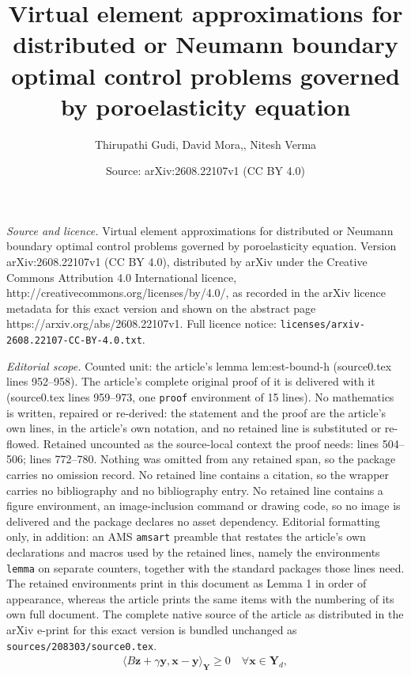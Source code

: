 \documentclass[10pt,a4paper]{amsart}
\title{Virtual element approximations for distributed or Neumann boundary optimal control problems governed by poroelasticity equation}
\author{Thirupathi Gudi, David Mora,, Nitesh Verma}
\date{Source: arXiv:2608.22107v1 (CC BY 4.0)}
\newcommand{\bY}{\boldsymbol{Y}}
\newcommand{\bYd}{\boldsymbol{Y}_d}
\newcommand\bx{\boldsymbol{x}}
\newcommand\by{\boldsymbol{y}}
\newcommand\bz{\boldsymbol{z}}
\begin{document}
\maketitle

\noindent\emph{Source and licence.} Virtual element approximations for distributed or Neumann boundary optimal control problems governed by poroelasticity equation. Version arXiv:2608.22107v1 (CC BY 4.0), distributed by arXiv under the Creative Commons Attribution 4.0 International licence, http://creativecommons.org/licenses/by/4.0/, as recorded in the arXiv licence metadata for this exact version and shown on the abstract page https://arxiv.org/abs/2608.22107v1. Full licence notice: \texttt{licenses/arxiv-2608.22107-CC-BY-4.0.txt}.\par\smallskip

\noindent\textit{Editorial scope.} Counted unit: the article's lemma lem:est-bound-h (source0.tex lines 952--958). The article's complete original proof of it is delivered with it (source0.tex lines 959--973, one \texttt{proof} environment of 15 lines). No mathematics is written, repaired or re-derived: the statement and the proof are the article's own lines, in the article's own notation, and no retained line is substituted or re-flowed.  Retained uncounted as the source-local context the proof needs: lines 504--506; lines 772--780.  Nothing was omitted from any retained span, so the package carries no omission record.  No retained line contains a citation, so the wrapper carries no bibliography and no bibliography entry.  No retained line contains a figure environment, an image-inclusion command or drawing code, so no image is delivered and the package declares no asset dependency.  Editorial formatting only, in addition: an AMS \texttt{amsart} preamble that restates the article's own declarations and macros used by the retained lines, namely the environments \texttt{lemma} on separate counters, together with the standard packages those lines need.  The retained environments print in this document as Lemma 1 in order of appearance, whereas the article prints the same items with the numbering of its own full document.  The complete native source of the article as distributed in the arXiv e-print for this exact version is bundled unchanged as \texttt{sources/208303/source0.tex}.
		\begin{align}\label{eq:optimality}
			\langle B \bz+ \gamma \by, \bx - \by \rangle_{\bY} \ge 0 \quad \forall \bx \in \bYd,
		\end{align}
\end{document}
